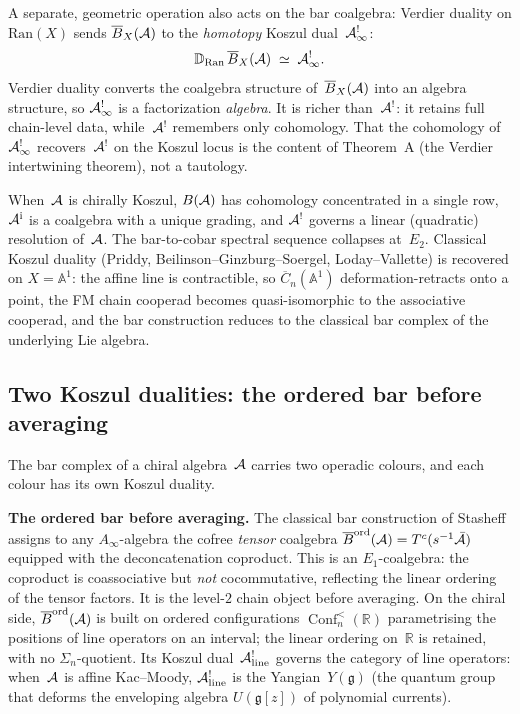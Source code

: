 A separate, geometric operation also acts on the bar coalgebra:
Verdier duality on $\mathrm{Ran}(X)$ sends $\overline{B}_X(\mathcal{A})$ to the
\emph{homotopy} Koszul dual~$\mathcal{A}^!_\infty$:
\[
\mathbb D_{\mathrm{Ran}}\,\overline{B}_X(\mathcal{A})
\;\simeq\;
\mathcal{A}^!_\infty.
\]
Verdier duality converts the coalgebra structure of~$\overline{B}_X(\mathcal{A})$
into an algebra structure, so $\mathcal{A}^!_\infty$ is a factorization
\emph{algebra}. It is richer than~$\mathcal{A}^!$: it retains full
chain-level data, while~$\mathcal{A}^!$ remembers only cohomology. That
the cohomology of $\mathcal{A}^!_\infty$ recovers~$\mathcal{A}^!$ on the Koszul
locus is the content of Theorem~A (the Verdier intertwining
theorem), not a tautology.

When~$\mathcal{A}$ is chirally Koszul, $B(\mathcal{A})$ has cohomology concentrated
in a single row, $\mathcal{A}^{\mathrm i}$ is a coalgebra with a unique
grading, and $\mathcal{A}^!$ governs a linear (quadratic) resolution
of~$\mathcal{A}$. The bar-to-cobar spectral sequence collapses at~$E_2$.
Classical Koszul duality
(Priddy, Beilinson--Ginzburg--Soergel, Loday--Vallette) is
recovered on $X=\mathbb A^1$: the affine line is contractible,
so $\overline{C}_n(\mathbb A^1)$ deformation-retracts onto
a point, the FM chain cooperad becomes quasi-isomorphic to the
associative cooperad, and the bar construction reduces to the
classical bar complex of the underlying Lie algebra.


\subsection*{Two Koszul dualities: the ordered bar before averaging}

The bar complex of a chiral algebra~$\mathcal{A}$ carries two operadic
colours, and each colour has its own Koszul duality.

\medskip
\noindent\textbf{The ordered bar before averaging.}\enspace
The classical bar construction of Stasheff assigns to any
$A_\infty$-algebra the cofree \emph{tensor} coalgebra
$\overline{B}^{\mathrm{ord}}(\mathcal{A}) = T^c(s^{-1}\bar{\mathcal{A}})$ equipped with the
deconcatenation coproduct.
This is an $E_1$-coalgebra: the coproduct is coassociative but
\emph{not} cocommutative, reflecting the linear ordering of the
tensor factors. It is the level-$2$ chain object before averaging. On the chiral side,
$\overline{B}^{\mathrm{ord}}(\mathcal{A})$ is built on ordered configurations
$\operatorname{Conf}_n^{<}(\mathbb R)$ parametrising the positions of
line operators on an interval; the linear ordering on~$\mathbb R$ is
retained, with no $\Sigma_n$-quotient. Its Koszul
dual~$\mathcal{A}^!_{\mathrm{line}}$ governs the category of line operators:
when~$\mathcal{A}$ is affine Kac--Moody, $\mathcal{A}^!_{\mathrm{line}}$ is the
Yangian~$Y(\mathfrak g)$ (the quantum group that deforms the
enveloping algebra $U(\mathfrak g[z])$ of polynomial currents).

